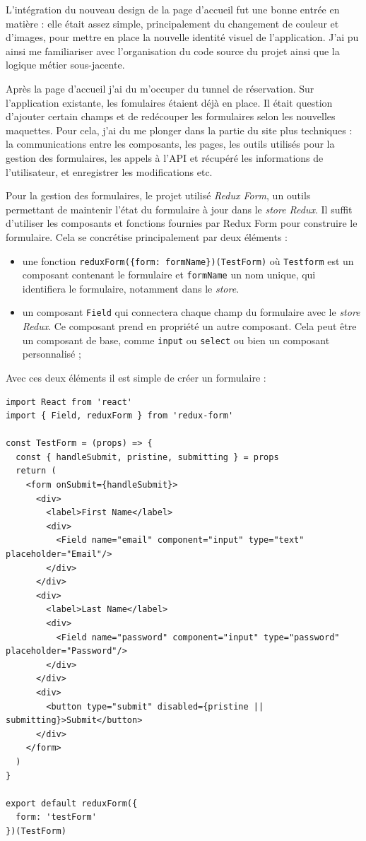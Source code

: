 \bigskip

L'intégration du nouveau design de la page d'accueil fut une bonne
entrée en matière : elle était assez simple, principalement du
changement de couleur et d'images, pour mettre en place la nouvelle
identité visuel de l'application. J'ai pu ainsi me familiariser avec
l'organisation du code source du projet ainsi que la logique métier
sous-jacente.

\bigskip

Après la page d'accueil j'ai du m'occuper du tunnel de réservation. Sur
l'application existante, les fomulaires étaient déjà en place. Il était
question d'ajouter certain champs et de redécouper les formulaires selon
les nouvelles maquettes. Pour cela, j'ai du me plonger dans la partie du
site plus techniques : la communications entre les composants, les
pages, les outils utilisés pour la gestion des formulaires, les appels à
l'API et récupéré les informations de l'utilisateur, et enregistrer les
modifications etc.

\bigskip

Pour la gestion des formulaires, le projet utilisé \emph{Redux Form}, un
outils permettant de maintenir l'état du formulaire à jour dans le
\emph{store Redux}. Il suffit d'utiliser les composants et fonctions
fournies par Redux Form pour construire le formulaire. Cela se
concrétise principalement par deux éléments :

\begin{itemize}
\tightlist
\item
  une fonction
  \texttt{reduxForm(\{form:\ \textquotesingle{}formName\textquotesingle{}\})(TestForm)}
  où \texttt{Testform} est un composant contenant le formulaire et
  \texttt{formName} un nom unique, qui identifiera le formulaire,
  notamment dans le \emph{store}.
\item
  un composant \texttt{Field} qui connectera chaque champ du formulaire
  avec le \emph{store Redux}. Ce composant prend en propriété un autre
  composant. Cela peut être un composant de base, comme \texttt{input}
  ou \texttt{select} ou bien un composant personnalisé ;
\end{itemize}

Avec ces deux éléments il est simple de créer un formulaire :

\begin{verbatim}
import React from 'react'
import { Field, reduxForm } from 'redux-form'

const TestForm = (props) => {
  const { handleSubmit, pristine, submitting } = props
  return (
    <form onSubmit={handleSubmit}>
      <div>
        <label>First Name</label>
        <div>
          <Field name="email" component="input" type="text" placeholder="Email"/>
        </div>
      </div>
      <div>
        <label>Last Name</label>
        <div>
          <Field name="password" component="input" type="password" placeholder="Password"/>
        </div>
      </div>
      <div>
        <button type="submit" disabled={pristine || submitting}>Submit</button>
      </div>
    </form>
  )
}

export default reduxForm({
  form: 'testForm'
})(TestForm)
\end{verbatim}

